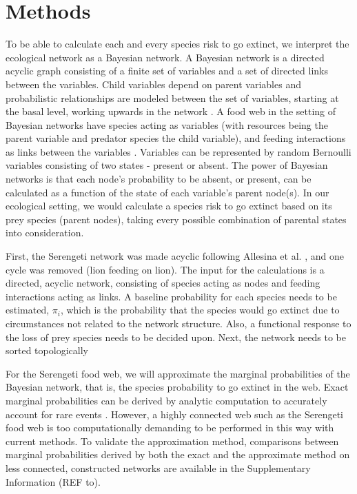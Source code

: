 \documentclass[a4paper,11pt]{article}
\begin{document}
\section*{Methods}
To be able to calculate each and every species risk to go extinct, we interpret the ecological network as a Bayesian network. A Bayesian network is a directed acyclic graph consisting of a finite set of variables and a set of directed links between the variables. Child variables depend on parent variables and probabilistic relationships are modeled between the set of variables, starting at the basal level, working upwards in the network \cite{JensenNielsen2007}. A food web in the setting of Bayesian networks have species acting as variables (with resources being the parent variable and predator species the child variable), and feeding interactions as links between the variables \cite{Eklofetal2013}. Variables can be represented by random Bernoulli variables consisting of two states - present or absent. The power of Bayesian networks is that each node's probability to be absent, or present, can be calculated as a function of the state of each variable's parent node(s). In our ecological setting, we would calculate a species risk to go extinct based on its prey species (parent nodes), taking every possible combination of parental states into consideration.

First, the Serengeti network was made acyclic following Allesina et al. \cite{Allesinaetal2009}, and one cycle was removed (lion feeding on lion). The input for the calculations is a directed, acyclic network, consisting of species acting as nodes and feeding interactions acting as links. A baseline probability for each species needs to be estimated, $\pi_{i}$, which is the probability that the species would go extinct due to circumstances not related to the network structure. Also, a functional response to the loss of prey species needs to be decided upon. Next, the network needs to be sorted topologically \cite{Allesinaetal2005}

For the Serengeti food web, we will approximate the marginal probabilities of the Bayesian network, that is, the species probability to go extinct in the web. Exact marginal probabilities can be derived by analytic computation to accurately account for rare events \citep{Eklofetal2013}. However, a highly connected web such as the Serengeti food web is too computationally demanding to be performed in this way with current methods. To validate the approximation method, comparisons between marginal probabilities derived by both the exact and the approximate method on less connected, constructed networks are available in the Supplementary Information (REF to). 
\end{document}
